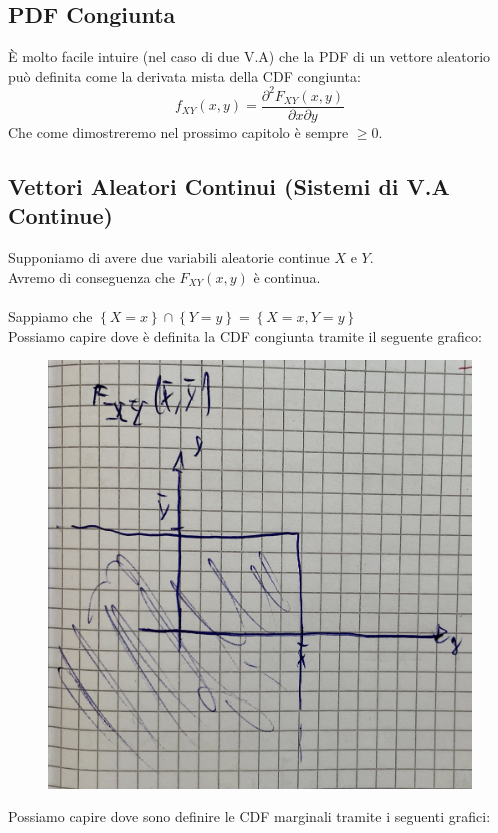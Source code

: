 \documentclass{article}
\begin{document}
\subsection{PDF Congiunta}
È molto facile intuire (nel caso di due V.A) che la PDF di un vettore aleatorio può definita come la derivata mista della CDF congiunta:
\[f_{XY}(x,y) = \frac{\partial^2 F_{XY}(x,y)}{\partial x \partial y}\]
Che come dimostreremo nel prossimo capitolo è sempre $\geq 0$.

\subsection{Vettori Aleatori Continui (Sistemi di V.A Continue)}
Supponiamo di avere due variabili aleatorie continue $X$ e $Y$. \\
Avremo di conseguenza che $F_{XY}(x,y)$ è continua. \\ \\
Sappiamo che $\left\{ X = x \right\} \cap \left\{ Y = y\right\} = \left\{X = x , Y = y\right\}$ \\
Possiamo capire dove è definita la CDF congiunta tramite il seguente grafico:
\begin{figure}[ht]
\centering
\includegraphics[scale=0.10]{images/76.CDF_Cong_Cont.jpeg}
\end{figure} 
Possiamo capire dove sono definire le CDF marginali tramite i seguenti grafici:
\end{document}
